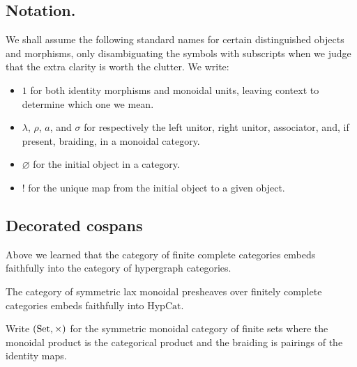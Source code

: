 \subsection{Notation.}
We shall assume the following standard names for certain distinguished objects
and morphisms, only disambiguating the symbols with subscripts when we judge
that the extra clarity is worth the clutter. We write: 
\begin{itemize} 
  \item $1$ for both identity morphisms and monoidal units, leaving context to
    determine which one we mean.
  \item $\lambda$, $\rho$, $a$, and $\sigma$ for respectively the left unitor, right unitor,
    associator, and, if present, braiding, in a monoidal category.
  \item $\varnothing$ for the initial object in a category.
  \item $!$ for the unique map from the initial object to a given object.
\end{itemize}



\subsection{Decorated cospans}

Above we learned that the category of finite complete categories embeds
faithfully into the category of hypergraph categories.

\begin{theorem}
  The category of symmetric lax monoidal presheaves over finitely complete categories embeds
  faithfully into $\mathrm{HypCat}$.
\end{theorem}

Write $(\mathrm{Set},\times)$ for the
symmetric monoidal category of finite sets where the monoidal product is the
categorical product and the braiding is pairings of the identity maps.


